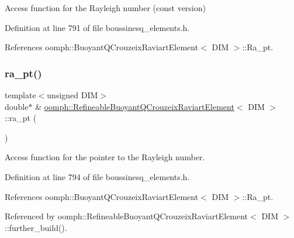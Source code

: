 Access function for the Rayleigh number (const version) 



Definition at line 791 of file boussinesq\+\_\+elements.\+h.



References oomph\+::\+Buoyant\+Q\+Crouzeix\+Raviart\+Element$<$ D\+I\+M $>$\+::\+Ra\+\_\+pt.

\mbox{\label{classoomph_1_1RefineableBuoyantQCrouzeixRaviartElement_acd96d12e3caedc1a38582079d977c0e4}} 
\subsubsection{\texorpdfstring{ra\+\_\+pt()}{ra\_pt()}}
{\footnotesize\ttfamily template$<$unsigned D\+IM$>$ \\
double$\ast$ \& \hyperlink{classoomph_1_1RefineableBuoyantQCrouzeixRaviartElement}{oomph\+::\+Refineable\+Buoyant\+Q\+Crouzeix\+Raviart\+Element}$<$ D\+IM $>$\+::ra\+\_\+pt (\begin{DoxyParamCaption}{ }\end{DoxyParamCaption})\hspace{0.3cm}{\ttfamily [inline]}}



Access function for the pointer to the Rayleigh number. 



Definition at line 794 of file boussinesq\+\_\+elements.\+h.



References oomph\+::\+Buoyant\+Q\+Crouzeix\+Raviart\+Element$<$ D\+I\+M $>$\+::\+Ra\+\_\+pt.



Referenced by oomph\+::\+Refineable\+Buoyant\+Q\+Crouzeix\+Raviart\+Element$<$ D\+I\+M $>$\+::further\+\_\+build().

\mbox{\label{classoomph_1_1RefineableBuoyantQCrouzeixRaviartElement_a00e5ff46d718e47374a3d1dc282f419c}} 
